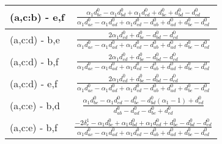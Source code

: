 \documentclass[12pt]{article}
\begin{document}
\begin{longtable}{l|c}
(a,c:b) - e,f& {$\displaystyle \frac{\alpha_{1} d^{\scriptscriptstyle 0}_{bc} - \alpha_{1} d^{\scriptscriptstyle 0}_{bd} + \alpha_{1} d^{\scriptscriptstyle 0}_{cd} + d^{\scriptscriptstyle 0}_{bc} + d^{\scriptscriptstyle 0}_{bd} - d^{\scriptscriptstyle 0}_{cd}}{\alpha_{1} d^{\scriptscriptstyle 0}_{ac} - \alpha_{1} d^{\scriptscriptstyle 0}_{ad} + \alpha_{1} d^{\scriptscriptstyle 0}_{cd} - d^{\scriptscriptstyle 0}_{ab} + d^{\scriptscriptstyle 0}_{ad} + d^{\scriptscriptstyle 0}_{bc} - d^{\scriptscriptstyle 0}_{cd}} $}\\[0.4cm]\hline 
(a,c:d) - b,e& {$\displaystyle \frac{2 \alpha_{1} d^{\scriptscriptstyle 0}_{cd} + d^{\scriptscriptstyle 0}_{bc} - d^{\scriptscriptstyle 0}_{bd} - d^{\scriptscriptstyle 0}_{cd}}{\alpha_{1} d^{\scriptscriptstyle 0}_{ac} - \alpha_{1} d^{\scriptscriptstyle 0}_{ad} + \alpha_{1} d^{\scriptscriptstyle 0}_{cd} - d^{\scriptscriptstyle 0}_{ab} + d^{\scriptscriptstyle 0}_{ad} + d^{\scriptscriptstyle 0}_{bc} - d^{\scriptscriptstyle 0}_{cd}} $}\\[0.4cm]\hline 
(a,c:d) - b,f& {$\displaystyle \frac{2 \alpha_{1} d^{\scriptscriptstyle 0}_{cd} + d^{\scriptscriptstyle 0}_{bc} - d^{\scriptscriptstyle 0}_{bd} - d^{\scriptscriptstyle 0}_{cd}}{\alpha_{1} d^{\scriptscriptstyle 0}_{ac} - \alpha_{1} d^{\scriptscriptstyle 0}_{ad} + \alpha_{1} d^{\scriptscriptstyle 0}_{cd} - d^{\scriptscriptstyle 0}_{ab} + d^{\scriptscriptstyle 0}_{ad} + d^{\scriptscriptstyle 0}_{bc} - d^{\scriptscriptstyle 0}_{cd}} $}\\[0.4cm]\hline 
(a,c:d) - e,f& {$\displaystyle \frac{2 \alpha_{1} d^{\scriptscriptstyle 0}_{cd} + d^{\scriptscriptstyle 0}_{bc} - d^{\scriptscriptstyle 0}_{bd} - d^{\scriptscriptstyle 0}_{cd}}{\alpha_{1} d^{\scriptscriptstyle 0}_{ac} - \alpha_{1} d^{\scriptscriptstyle 0}_{ad} + \alpha_{1} d^{\scriptscriptstyle 0}_{cd} - d^{\scriptscriptstyle 0}_{ab} + d^{\scriptscriptstyle 0}_{ad} + d^{\scriptscriptstyle 0}_{bc} - d^{\scriptscriptstyle 0}_{cd}} $}\\[0.4cm]\hline 
(a,c:e) - b,d& {$\displaystyle \frac{\alpha_{1} d^{\scriptscriptstyle 0}_{bc} - \alpha_{1} d^{\scriptscriptstyle 0}_{cd} - d^{\scriptscriptstyle 0}_{bc} - d^{\scriptscriptstyle 0}_{bd} \left(\alpha_{1} - 1\right) + d^{\scriptscriptstyle 0}_{cd}}{d^{\scriptscriptstyle 0}_{ab} - d^{\scriptscriptstyle 0}_{ad} - d^{\scriptscriptstyle 0}_{bc} + d^{\scriptscriptstyle 0}_{cd}} $}\\[0.4cm]\hline 
(a,c:e) - b,f& {$\displaystyle \frac{- 2 \delta^1_{e} - \alpha_{1} d^{\scriptscriptstyle 0}_{bc} + \alpha_{1} d^{\scriptscriptstyle 0}_{bd} + \alpha_{1} d^{\scriptscriptstyle 0}_{cd} + d^{\scriptscriptstyle 0}_{bc} - d^{\scriptscriptstyle 0}_{bd} - d^{\scriptscriptstyle 0}_{cd}}{\alpha_{1} d^{\scriptscriptstyle 0}_{ac} - \alpha_{1} d^{\scriptscriptstyle 0}_{ad} + \alpha_{1} d^{\scriptscriptstyle 0}_{cd} - d^{\scriptscriptstyle 0}_{ab} + d^{\scriptscriptstyle 0}_{ad} + d^{\scriptscriptstyle 0}_{bc} - d^{\scriptscriptstyle 0}_{cd}} $}\\[0.4cm]\hline 

\end{longtable}
\end{document}
